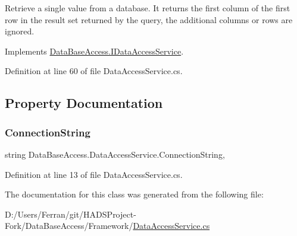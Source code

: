 Retrieve a single value from a database. It returns the first column of the first row in the result set returned by the query, the additional columns or rows are ignored. 



Implements \mbox{\hyperlink{interfaceDataBaseAccess_1_1IDataAccessService_a0788e764e3f4418039d73291b8c7e87c}{Data\+Base\+Access.\+I\+Data\+Access\+Service}}.



Definition at line 60 of file Data\+Access\+Service.\+cs.



\subsection{Property Documentation}
\mbox{\label{classDataBaseAccess_1_1DataAccessService_a68fdde0329f29760ea79961cb70da656}} 
\subsubsection{\texorpdfstring{ConnectionString}{ConnectionString}}
{\footnotesize\ttfamily string Data\+Base\+Access.\+Data\+Access\+Service.\+Connection\+String\hspace{0.3cm}{\ttfamily [get]}, {}}







Definition at line 13 of file Data\+Access\+Service.\+cs.



The documentation for this class was generated from the following file\+:\begin{DoxyCompactItemize}
\item 
D\+:/\+Users/\+Ferran/git/\+H\+A\+D\+S\+Project-\/\+Fork/\+Data\+Base\+Access/\+Framework/\mbox{\hyperlink{DataAccessService_8cs}{Data\+Access\+Service.\+cs}}\end{DoxyCompactItemize}
